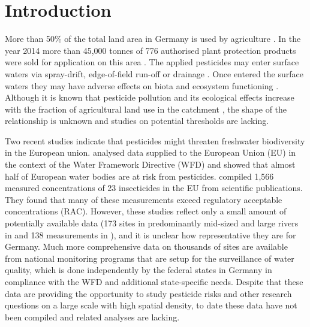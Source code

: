\section{Introduction}
More than 50\% of the total land area in Germany is used by agriculture \citep{statistisches_bundesamt_bodenflache_2014}.
In the year 2014 more than 45,000 tonnes of 776 authorised plant protection products were sold for application on this area \citep{bundesamt_fur_verbraucherschutz_und_lebensmittelsicherheit_absatz_2015}.
The applied pesticides may enter surface waters via spray-drift, edge-of-field run-off or drainage \citep{stehle_probabilistic_2013,schulz_comparison_2001,liess_determination_1999}.
Once entered the surface waters they may have adverse effects on biota and ecosystem functioning \citep{schafer_thresholds_2012}. 
Although it is known that pesticide pollution and its ecological effects increase with the fraction of agricultural land use in the catchment \citep{schulz_field_2004}, the shape of the relationship is unknown and studies on potential thresholds are lacking.

Two recent studies indicate that pesticides might threaten freshwater biodiversity in the European union.
\citet{malaj_organic_2014} analysed data supplied to the European Union (EU) in the context of the Water Framework Directive (WFD) and showed that almost half of European water bodies are at risk from pesticides.
\citet{stehle_pesticide_2015} compiled 1,566 measured concentrations of 23 insecticides in the EU from scientific publications. 
They found that many of these measurements exceed regulatory acceptable concentrations (RAC).
However, these studies reflect only a small amount of potentially available data (173 sites in predominantly mid-sized and large rivers in \citet{malaj_organic_2014} and 138 measurements in \citet{stehle_pesticide_2015}), and it is unclear how representative they are for Germany. %
Much more comprehensive data on thousands of sites are available from national monitoring programs that are setup for the surveillance of water quality,
which is done independently by the federal states in Germany in compliance with the WFD \citep{quevauviller_water_2008} and additional state-specific needs. 
Despite that these data are providing the opportunity to study pesticide risks and other research questions on a large scale with high spatial density, to date these data have not been compiled and related analyses are lacking. 

